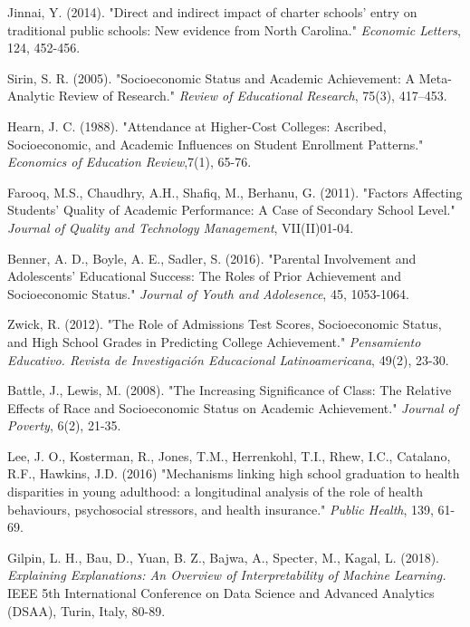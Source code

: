 \documentclass[sigconf,nonacm,11pt]{acmart}
\begin{document}
\begin{thebibliography}{9}
Jinnai, Y. (2014). "Direct and indirect impact of charter schools’ entry on traditional public schools: New evidence from North Carolina." \textit{Economic Letters}, 124, 452-456.

Sirin, S. R. (2005).
"Socioeconomic Status and Academic Achievement: A Meta-Analytic Review of Research." \textit{Review of Educational Research}, 75(3), 417–453.

Hearn, J. C. (1988). "Attendance at Higher-Cost Colleges: Ascribed, Socioeconomic, and Academic Influences on Student Enrollment Patterns." \textit{Economics of Education Review},7(1), 65-76.

Farooq, M.S., Chaudhry, A.H., Shafiq, M., Berhanu, G. (2011). "Factors Affecting Students' Quality of Academic Performance: A Case of Secondary School Level." \textit{Journal of Quality and Technology Management}, VII(II)01-04.

Benner, A. D., Boyle, A. E., Sadler, S. (2016). "Parental Involvement and Adolescents’ Educational Success: The Roles of Prior Achievement and Socioeconomic Status." \textit{Journal of Youth and Adolesence}, 45, 1053-1064.

Zwick, R. (2012). "The Role of Admissions Test Scores, Socioeconomic Status, and High School Grades in Predicting College Achievement." \textit{Pensamiento Educativo. Revista de Investigación Educacional Latinoamericana}, 49(2), 23-30.

Battle, J., Lewis, M. (2008). "The Increasing Significance of Class: The Relative Effects of Race and Socioeconomic Status on Academic Achievement." \textit{Journal of Poverty}, 6(2), 21-35.

Lee, J. O., Kosterman, R., Jones, T.M., Herrenkohl, T.I., Rhew, I.C., Catalano, R.F., Hawkins, J.D. (2016) "Mechanisms linking high school graduation to health disparities in young adulthood: a longitudinal analysis of the role of health behaviours, psychosocial stressors, and health insurance." \textit{Public Health}, 139, 61-69.

Gilpin, L. H., Bau, D., Yuan, B. Z., Bajwa, A., Specter,  M., Kagal, L. (2018). \textit{Explaining Explanations: An Overview of Interpretability of Machine Learning.} IEEE 5th International Conference on Data Science and Advanced Analytics (DSAA), Turin, Italy, 80-89.


\end{thebibliography}
\end{document}

